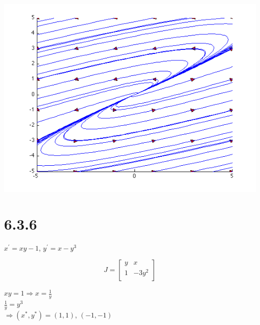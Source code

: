 \documentclass[12pt]{article}
\begin{document}
\includegraphics[scale=.5]{5-2-5.png}

\section*{6.3.6}

\(x^{'} = xy - 1\), \(y^{'} = x - y^3\)

\begin{displaymath}
  J = \left[
  \begin{array}{cc}
    y & x\\
    1 & -3y^2\\
    \end{array}
  \right]
\end{displaymath}

\(xy = 1 \Rightarrow x = \frac{1}{y}\)\\
\(\frac{1}{y} = y^3\)\\
\(\Rightarrow (x^{*}, y^{*}) = (1, 1)\), \((-1,-1)\)\\
\end{document}
